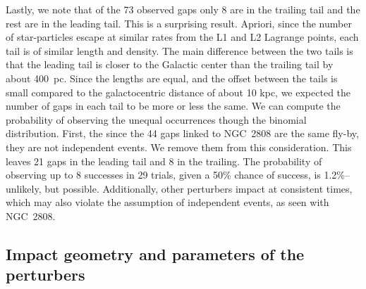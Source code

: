 \documentclass[draft]{aa}
\begin{document}
    Lastly, we note that of the 73 observed gaps only 8 are in the trailing tail and the rest are in the leading tail. This is a surprising result. Apriori, since the number of star-particles escape at similar rates from the L1 and L2 Lagrange points, each tail is of similar length and density. The main difference between the two tails is that the leading tail is closer to the Galactic center than the trailing tail by about 400~pc. Since the lengths are equal, and the offset between the tails is small compared to the galactocentric distance of about 10 kpc, we expected the number of gaps in each tail to be more or less the same. We can compute the probability of observing the unequal occurrences though the binomial distribution. First, the since the 44 gaps linked to NGC~2808 are the same fly-by, they are not independent events. We remove them from this consideration. This leaves 21 gaps in the leading tail and 8 in the trailing. The probability of observing up to 8 successes in 29 trials, given a 50\% chance of success, is 1.2\%--unlikely, but possible. Additionally, other perturbers impact at consistent times, which may also violate the assumption of independent events, as seen with NGC~2808.


   
  \subsection{Impact geometry and parameters of the perturbers}\label{sect:geometry}
  
\end{document}
